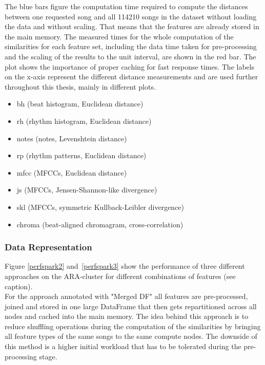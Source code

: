 \noindent The blue bars figure the computation time required to compute the distances between one requested song and all 114210 songs in the dataset without loading the data and without scaling. That means that the features are already stored in the main memory. The measured times for the whole computation of the similarities for each feature set, including the data time taken for pre-processing and the scaling of the results to the unit interval, are shown in the red bar. The plot shows the importance of proper caching for fast response times. 
\noindent The labels on the x-axis represent the different distance measurements and are used further throughout this thesis, mainly in different plots. 

\begin{itemize}
	\setlength\itemsep{-0.5em}
	\item bh (beat histogram, Euclidean distance)
	\item rh (rhythm histogram, Euclidean distance)
	\item notes (notes, Levenshtein distance)
	\item rp (rhythm patterns, Euclidean distance)
	\item mfcc (MFCCs, Euclidean distance)
	\item js (MFCCs, Jensen-Shannon-like divergence)
	\item skl (MFCCs, symmetric Kullback-Leibler divergence)
	\item chroma (beat-aligned chromagram, cross-correlation)
\end{itemize}

\subsubsection{Data Representation}

\noindent Figure \ref {perfspark2} and~\ref{perfspark3} show the performance of three different approaches on the ARA-cluster for different combinations of features (see caption).\\
\noindent For the approach annotated with "Merged DF" all features are pre-processed, joined and stored in one large DataFrame that then gets repartitioned across all nodes and cached into the main memory. The idea behind this approach is to reduce shuffling operations during the computation of the similarities by bringing all feature types of the same songs to the same compute nodes. The downside of this method is a higher initial workload that has to be tolerated during the pre-processing stage. 


